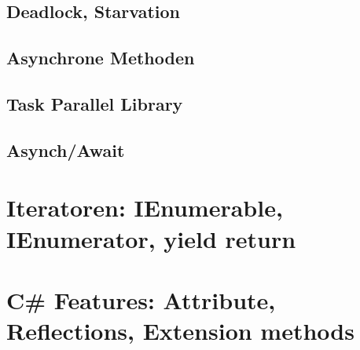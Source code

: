 \documentclass{scrreprt}
\begin{document}
\section{Deadlock, Starvation}

\section{Asynchrone Methoden}

\section{Task Parallel Library}

\section{Asynch/Await}


\chapter{Iteratoren: IEnumerable, IEnumerator, yield return}


\chapter{C\# Features: Attribute, Reflections, Extension methods}

\end{document}

